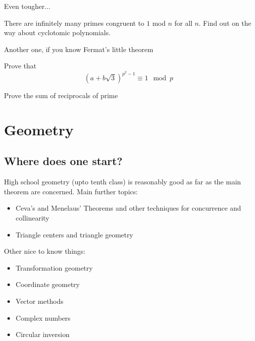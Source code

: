\documentclass[a4paper]{amsart}
\begin{document}
Even tougher...

There are infinitely many primes congruent to $1$ mod $n$ for all $n$. Find out on the way about cyclotomic polynomials.

Another one, if you know Fermat's little theorem

Prove that $$(a + b\sqrt{3})^{p^2 - 1} \equiv 1 \mod p$$

Prove the sum of reciprocals of prime %



\section{Geometry}

\subsection{Where does one start?}

High school geometry (upto tenth class) is reasonably good as far as the main theorem are concerned. Main further topics:

\begin{itemize}

\item Ceva's and Menelaus' Theorems and other techniques for concurrence and collinearity %

\item Triangle centers and triangle geometry%

\end{itemize}

Other nice to know things:

\begin{itemize}

\item Transformation geometry

\item Coordinate geometry

\item Vector methods

\item Complex numbers

\item Circular inversion

\end{itemize}
\end{document}
